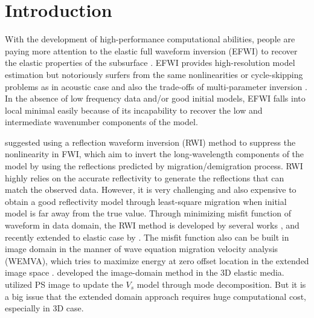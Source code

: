\section{Introduction}
With the development of high-performance computational abilities, people are paying more
attention to the elastic full waveform inversion (EFWI) to recover the elastic properties of the
subsurface \cite[]{vigh:2014}.
EFWI provides high-resolution model estimation but notoriously surfers from
the same nonlinearities or cycle-skipping problems as in acoustic
case and also the trade-offs of multi-parameter inversion \cite[]{operto2013guided}.
In the absence of low frequency data and/or good initial models, EFWI falls into local minimal
easily
because of its incapability to recover the low and intermediate wavenumber components of the model.

\cite{xu:2012} suggested using a reflection waveform inversion (RWI) method to suppress the
nonlinearity in FWI, 
which aim to invert the long-wavelength components of the model by using the reflections 
predicted by migration/demigration process.
RWI highly relies on the accurate reflectivity to generate the reflections that can match the
observed data. However, it is very challenging and also expensive to obtain a good reflectivity model through 
least-square migration when initial model is far away from the true value.
Through minimizing misfit function of waveform in data domain, the RWI method is developed
by several works \cite[]{Wu2015b,Zhou2015}, and recently extended to elastic case by
\cite{Guo2016}.
The misfit function also can be built in image domain in the manner of wave equation migration
velocity analysis (WEMVA), which tries to maximize
energy at zero offset location in the extended image space
\cite[]{BiondiEtAl2012,SunEtAl2012}.
\cite{RaknesEtAl2016} 
developed the image-domain method in the 3D elastic media. 
\cite{Wang2017WEMVA} utilized PS image to update the $V_s$ model through mode decomposition.
But it is a big issue that the extended domain approach requires huge computational cost,
especially in 3D case.


